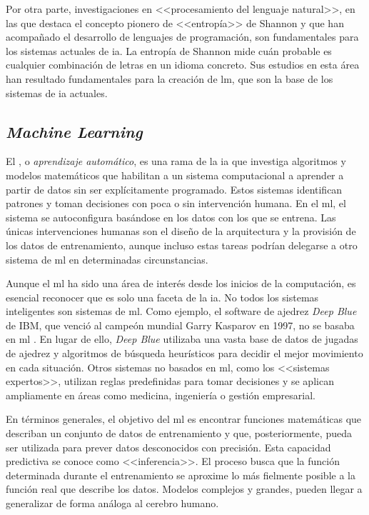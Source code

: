 
Por otra parte, investigaciones en <<procesamiento del lenguaje natural>>, en las que destaca el concepto pionero de <<entropía>> de Shannon \citep{shannon1951prediction} y que han acompañado el desarrollo de lenguajes de programación, son fundamentales para los sistemas actuales de \gls{ia}. La entropía de Shannon mide cuán probable es cualquier combinación de letras en un idioma concreto. Sus estudios en esta área han resultado fundamentales para la creación de \gls{lm}, que son la base de los sistemas de \gls{ia} actuales.


\subsection{\textit{Machine Learning}}

El  , o \textit{aprendizaje automático}, es una rama de la \gls{ia} que investiga algoritmos y modelos matemáticos que habilitan a un sistema computacional a aprender a partir de datos sin ser explícitamente programado. Estos sistemas identifican patrones y toman decisiones con poca o sin intervención humana. En el \gls{ml}, el sistema se autoconfigura basándose en los datos con los que se entrena. Las únicas intervenciones humanas son el diseño de la arquitectura y la provisión de los datos de entrenamiento, aunque incluso estas tareas podrían delegarse a otro sistema de \gls{ml} en determinadas circunstancias.

Aunque el \gls{ml} ha sido una área de interés desde los inicios de la computación, es esencial reconocer que es solo una faceta de la \gls{ia}. No todos los sistemas inteligentes son sistemas de \gls{ml}. Como ejemplo, el software de ajedrez \textit{Deep Blue} de IBM, que venció al campeón mundial Garry Kasparov en 1997, no se basaba en \gls{ml} \citep{campbellDeepBlue2002}. En lugar de ello, \textit{Deep Blue} utilizaba una vasta base de datos de jugadas de ajedrez y algoritmos de búsqueda heurísticos para decidir el mejor movimiento en cada situación. Otros sistemas no basados en \gls{ml}, como los <<sistemas expertos>>, utilizan reglas predefinidas para tomar decisiones y se aplican ampliamente en áreas como medicina, ingeniería o gestión empresarial.

En términos generales, el objetivo del \gls{ml} es encontrar funciones matemáticas que describan un conjunto de datos de entrenamiento y que, posteriormente, pueda ser utilizada para prever datos desconocidos con precisión. Esta capacidad predictiva se conoce como <<inferencia>>. El proceso busca que la función determinada durante el entrenamiento se aproxime lo más fielmente posible a la función real que describe los datos. Modelos complejos y grandes, pueden llegar a generalizar de forma análoga al cerebro humano. 


